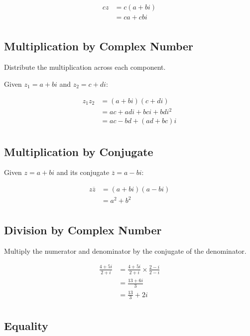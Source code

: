 \documentclass[a4paper,11pt]{article}
\begin{document}
$$
\begin{aligned}
cz & = c(a + bi) \\
& = ca + cbi \\
\end{aligned}
$$


\subsection{Multiplication by Complex Number}

Distribute the multiplication across each component.

Given $z_1 = a + bi$ and $z_2 = c + di$:

$$
\begin{aligned}
z_1 z_2 & = (a + bi)(c + di) \\
& = ac + adi + bci + bdi^2 \\
& = ac - bd + (ad + bc)i \\
\end{aligned}
$$


\subsection{Multiplication by Conjugate}

Given $z = a + bi$ and its conjugate $\overline{z} = a - bi$:

$$
\begin{aligned}
z \overline{z} & = (a + bi)(a - bi) \\
& = a^2 + b^2 \\
\end{aligned}
$$


\subsection{Division by Complex Number}

Multiply the numerator and denominator by the conjugate of the denominator.

$$
\begin{aligned}
\frac{4 + 5i}{2 + i} & = \frac{4 + 5i}{2 + i} \times \frac{2 - i}{2 - i} \\
& = \frac{13 + 6i}{3} \\
& = \frac{13}{3} + 2i \\
\end{aligned}
$$


\subsection{Equality}
\end{document}
